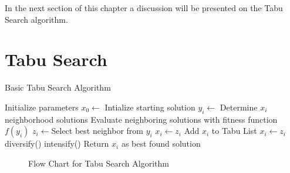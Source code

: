 In the next section of this chapter a discussion will be presented on the Tabu Search algorithm.

\section{Tabu Search}
\begin{algorithm}
\caption{Basic Tabu Search Algorithm}
\label{alg:TS}
	\begin{algorithmic}[1]
		\STATE Initialize parameters
		\STATE $x_0 \leftarrow$ Intialize starting solution
			\STATE $y_i \leftarrow$ Determine $x_i$ neighborhood solutions 
			\STATE Evaluate neighboring solutions with fitness function $f(y_i)$
			\STATE $z_i \leftarrow$Select best neighbor from $y_i$
					\STATE $x_i \leftarrow z_i$
				\ENDIF
			\ELSE
				\STATE Add $x_i$ to Tabu List
				\STATE $x_i \leftarrow z_i$
					\STATE diversify()
				\ELSE
					\STATE intensify()
				\ENDIF
			\ENDIF
		\ENDWHILE
		\STATE Return $x_i$ as best found solution
	\end{algorithmic}
\end{algorithm}
\begin{figure}[p!]
	\begin{center}
	\caption{Flow Chart for Tabu Search Algorithm}
	\label{fig:TSAlgorithmFlowChart}
	\end{center}
\end{figure}
